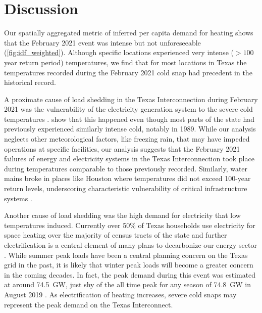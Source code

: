 \documentclass[12pt]{iopart}
\begin{document}
\section{Discussion}

Our spatially aggregated metric of inferred per capita demand for heating shows that the February 2021 event was intense but not unforeseeable (\cref{fig:idf_weighted}).
Although specific locations experienced very intense ($>100$ year return period) temperatures, we find that for most locations in Texas the temperatures recorded during the February 2021 cold snap had precedent in the historical record.

A proximate cause of load shedding in the Texas Interconnection during February 2021 was the vulnerability of the electricity generation system to the severe cold temperatures \cite{everhart_iea:2021}.
 show that this happened even though most parts of the state had previously experienced similarly intense cold, notably in 1989.
While our analysis neglects other meteorological factors, like freezing rain, that may have impeded operations at specific facilities, our analysis suggests that the February 2021 failures of energy and electricity systems in the Texas Interconnection took place during temperatures comparable to those previously recorded.
Similarly, water mains broke in places like Houston where temperatures did not exceed 100-year return levels, underscoring characteristic vulnerability of critical infrastructure systems \cite{chester_reliable:2020}.

Another cause of load shedding was the high demand for electricity that low temperatures induced.
Currently over 50\% of Texas households use electricity for space heating over the majority of census tracts of the state \cite{waite_heating:2020} and further electrification is a central element of many plans to decarbonize our energy sector \cite{williams_decarbonization:2012,davis:2018,white_txresidential:2019}.
While summer peak loads have been a central planning concern on the Texas grid in the past, it is likely that winter peak loads will become a greater concern in the coming decades.
In fact, the peak demand during this event was estimated at around \SI{74.5}{\giga\watt}, just shy of the all time peak for any season of \SI{74.8}{\giga\watt} in August 2019 \cite{everhart_iea:2021}.
As electrification of heating increases, severe cold snaps may represent the peak demand on the Texas Interconnect.
\end{document}
